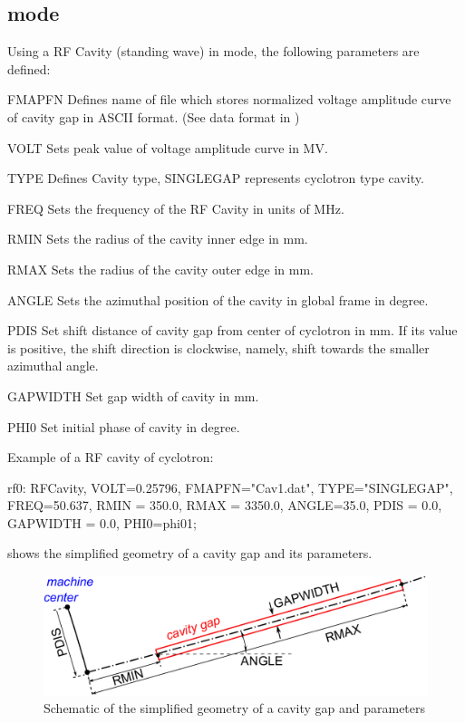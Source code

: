 \subsection{\opalcycl mode}
\label{sec:cavity-cycl}
Using a RF Cavity (standing wave) in \opalcycl mode, the following  parameters are defined:
\begin{kdescription}
\item[FMAPFN]
  Defines name of file which stores normalized voltage amplitude curve of cavity gap in ASCII format.
  (See data format in )
 \item[VOLT]
  Sets peak value of voltage amplitude curve in MV.
  \item[TYPE]
  Defines Cavity type, SINGLEGAP represents cyclotron type cavity.
  \item[FREQ]
  Sets the frequency of the RF Cavity in units of MHz.
  \item[RMIN]
  Sets the radius of the cavity inner edge in mm.
  \item[RMAX]
  Sets the radius of the cavity outer edge in mm.

  \item[ANGLE]
  Sets the azimuthal position of the cavity in global frame in degree.

  \item[PDIS]
  Set shift distance of cavity gap from center of cyclotron in mm. If its value is positive,
  the shift direction is clockwise, namely, shift towards the smaller azimuthal angle.

  \item[GAPWIDTH]
  Set gap width of  cavity in mm.

  \item[PHI0]
  Set initial phase of cavity in degree.

\end{kdescription}

\noindent Example of a RF cavity of cyclotron:
\begin{example}
rf0: RFCavity, VOLT=0.25796, FMAPFN="Cav1.dat",
     TYPE="SINGLEGAP", FREQ=50.637, RMIN = 350.0,
     RMAX = 3350.0, ANGLE=35.0,   PDIS = 0.0,
     GAPWIDTH = 0.0, PHI0=phi01;
\end{example}

 shows the simplified geometry of a cavity gap and its parameters.

\begin{figure}[hbt]
  \centering\includegraphics[scale=0.6]{./figures/cyclotron/Cavity.pdf}
  \caption{Schematic of the simplified geometry of a cavity gap and parameters}
  \label{fig:Cyclotron_cavity}
\end{figure}


